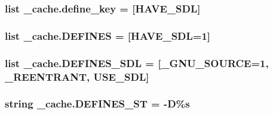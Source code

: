 \subsubsection[{\texorpdfstring{define\+\_\+key}{define_key}}]{\setlength{\rightskip}{0pt plus 5cm}list \+\_\+cache.\+define\+\_\+key = \mbox{[}\textquotesingle{}H\+A\+V\+E\+\_\+\+S\+DL\textquotesingle{}\mbox{]}}\hypertarget{namespace__cache_ad68aab9d6304c09cd1533dc41ecad39f}{}\label{namespace__cache_ad68aab9d6304c09cd1533dc41ecad39f}
\subsubsection[{\texorpdfstring{D\+E\+F\+I\+N\+ES}{DEFINES}}]{\setlength{\rightskip}{0pt plus 5cm}list \+\_\+cache.\+D\+E\+F\+I\+N\+ES = \mbox{[}\textquotesingle{}H\+A\+V\+E\+\_\+\+S\+DL=1\textquotesingle{}\mbox{]}}\hypertarget{namespace__cache_a662b9c55150aee883a622482cae5dab0}{}\label{namespace__cache_a662b9c55150aee883a622482cae5dab0}
\subsubsection[{\texorpdfstring{D\+E\+F\+I\+N\+E\+S\+\_\+\+S\+DL}{DEFINES_SDL}}]{\setlength{\rightskip}{0pt plus 5cm}list \+\_\+cache.\+D\+E\+F\+I\+N\+E\+S\+\_\+\+S\+DL = \mbox{[}\textquotesingle{}\+\_\+\+G\+N\+U\+\_\+\+S\+O\+U\+R\+CE=1\textquotesingle{}, \textquotesingle{}\+\_\+\+R\+E\+E\+N\+T\+R\+A\+NT\textquotesingle{}, \textquotesingle{}U\+S\+E\+\_\+\+S\+DL\textquotesingle{}\mbox{]}}\hypertarget{namespace__cache_a2f75ff22e404864c30421dd4d36f7d10}{}\label{namespace__cache_a2f75ff22e404864c30421dd4d36f7d10}
\subsubsection[{\texorpdfstring{D\+E\+F\+I\+N\+E\+S\+\_\+\+ST}{DEFINES_ST}}]{\setlength{\rightskip}{0pt plus 5cm}string \+\_\+cache.\+D\+E\+F\+I\+N\+E\+S\+\_\+\+ST = \textquotesingle{}-\/D\%s\textquotesingle{}}\hypertarget{namespace__cache_aa0561cd9e9967e79374d25f0b2124c31}{}\label{namespace__cache_aa0561cd9e9967e79374d25f0b2124c31}
